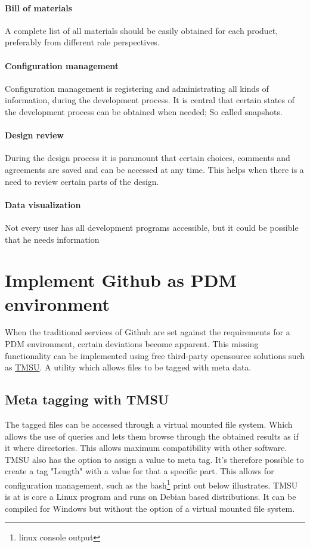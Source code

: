\documentclass[fleqn,10pt]{SelfArx} %
\begin{document}
\paragraph{Bill of materials}
A complete list of all materials should be easily obtained for each product, preferably from different role perspectives.

\paragraph{Configuration management}
Configuration management is registering and administrating all kinds of information, during the development process. It is central that certain states of the development process can be obtained when needed; So called snapshots.

\paragraph{Design review}
During the design process it is paramount that certain choices, comments and agreements are saved and can be accessed at any time. This helps when there is a need to review certain parts of the design.

\paragraph{Data visualization}
Not every user has all development programs accessible, but it could be possible that he needs information 
 
\section{Implement Github as PDM environment}
When the traditional services of Github are set against the requirements for a PDM environment, certain deviations become apparent. This missing functionality can be implemented using free third-party opensource solutions such as \href{http://tmsu.org/}{\color{color1}TMSU}. A utility which allows files to be tagged with meta data.

\subsection{Meta tagging with TMSU}
The tagged files can be accessed through a virtual mounted file system. Which allows the use of queries and lets them browse through the obtained results as if it where directories. This allows maximum compatibility with other software. TMSU also has the option to assign a value to meta tag. It's therefore possible to create a tag "Length" with a value for that a specific part. This allows for configuration management, such as the bash\footnote{linux console output} print out below illustrates. TMSU is at is core a Linux program and runs on Debian based distributions. It can be compiled for Windows but without the option of a virtual mounted file system.
\end{document}
